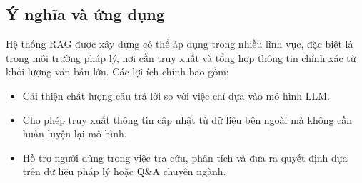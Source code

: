 \subsection{Ý nghĩa và ứng dụng}

Hệ thống RAG được xây dựng có thể áp dụng trong nhiều lĩnh vực, đặc biệt là trong môi trường pháp lý, nơi cần truy xuất và tổng hợp thông tin chính xác từ khối lượng văn bản lớn. Các lợi ích chính bao gồm:

\begin{itemize}
  \item Cải thiện chất lượng câu trả lời so với việc chỉ dựa vào mô hình LLM.
  \item Cho phép truy xuất thông tin cập nhật từ dữ liệu bên ngoài mà không cần huấn luyện lại mô hình.
  \item Hỗ trợ người dùng trong việc tra cứu, phân tích và đưa ra quyết định dựa trên dữ liệu pháp lý hoặc Q\&A chuyên ngành.
\end{itemize}
